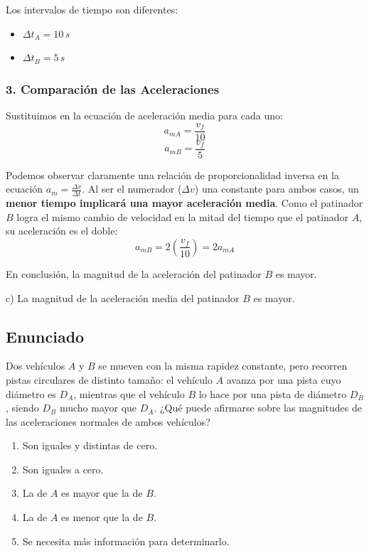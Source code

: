 \documentclass[12pt, a4paper]{article}
\begin{document}
Los intervalos de tiempo son diferentes:
\begin{itemize}
    \item $\Delta t_A = 10 \, \si{s}$
    \item $\Delta t_B = 5 \, \si{s}$
\end{itemize}

\subsubsection*{3. Comparación de las Aceleraciones}
Sustituimos en la ecuación de aceleración media para cada uno:
$$ a_{mA} = \frac{v_f}{10} $$
$$ a_{mB} = \frac{v_f}{5} $$

Podemos observar claramente una relación de proporcionalidad inversa en la ecuación $a_m = \frac{\Delta v}{\Delta t}$. Al ser el numerador ($\Delta v$) una constante para ambos casos, un \textbf{menor tiempo implicará una mayor aceleración media}.
Como el patinador $B$ logra el mismo cambio de velocidad en la mitad del tiempo que el patinador $A$, su aceleración es el doble:
$$ a_{mB} = 2 \left(\frac{v_f}{10}\right) = 2 a_{mA} $$

En conclusión, la magnitud de la aceleración del patinador $B$ es mayor.

\begin{tcolorbox}[colback=green!5!white, colframe=green!50!black, title=Respuesta Final]
\centering \Large c) La magnitud de la aceleración media del patinador $B$ es mayor.
\end{tcolorbox}

\newpage

\subsection*{Enunciado}
Dos vehículos $A$ y $B$ se mueven con la misma rapidez constante, pero recorren pistas circulares de distinto tamaño: el vehículo $A$ avanza por una pista cuyo diámetro es $D_A$, mientras que el vehículo $B$ lo hace por una pista de diámetro $D_B$, siendo $D_B$ mucho mayor que $D_A$. ¿Qué puede afirmarse sobre las magnitudes de las aceleraciones normales de ambos vehículos?

\begin{enumerate}[label=\alph*)]
    \item Son iguales y distintas de cero.
    \item Son iguales a cero.
    \item La de $A$ es mayor que la de $B$.
    \item La de $A$ es menor que la de $B$.
    \item Se necesita más información para determinarlo.
\end{enumerate}
\end{document}
